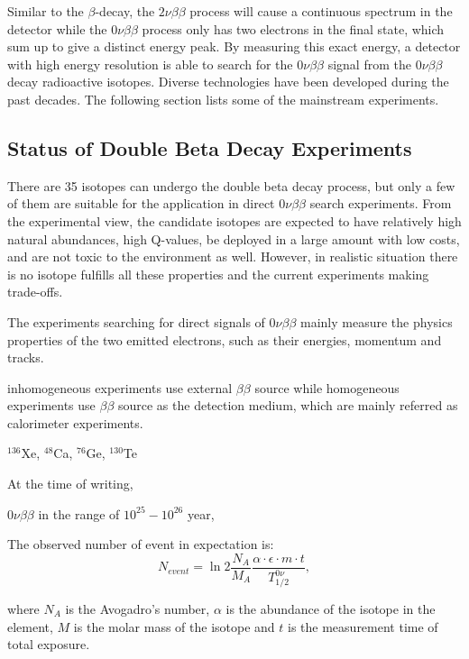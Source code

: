 Similar to the $\beta$-decay, the $2\nu\beta\beta$ process will cause a continuous spectrum in the detector while the $0\nu\beta\beta$ process only has two electrons in the final state, which sum up to give a distinct energy peak. By measuring this exact energy, a detector with high energy resolution is able to search for the $0\nu\beta\beta$ signal from the $0\nu\beta\beta$ decay radioactive isotopes. Diverse technologies have been developed during the past decades. The following section lists some of the mainstream experiments.





\subsection{Status of Double Beta Decay Experiments}

There are 35 isotopes can undergo the double beta decay process, but only a few of them are suitable for the application in direct $0\nu\beta\beta$ search experiments\cite{giunti2007fundamentals}. From the experimental view, the candidate isotopes are expected to have relatively high natural abundances, high Q-values, be deployed in a large amount with low costs, and are not toxic to the environment as well. However, in realistic situation there is no isotope fulfills all these properties and the current experiments making trade-offs\cite{dolinski2019neutrinoless}.

The experiments searching for direct signals of $0\nu\beta\beta$ mainly measure the physics properties of the two emitted electrons, such as their energies, momentum and tracks. 

inhomogeneous experiments use external $\beta\beta$ source
while homogeneous experiments use $\beta\beta$ source as the detection medium, which are mainly referred as calorimeter experiments\cite{cremonesi2014challenges,shimizu2019double}.


$^{136}$Xe, $^{48}$Ca, $^{76}$Ge, $^{130}$Te

At the time of writing, 

$0\nu\beta\beta$ in the range of $10^{25}-10^{26}$ year,



The observed number of event in expectation is: 
\[
N_{event} = \ln 2 \frac{N_A}{M_A}\frac{\alpha\cdot\epsilon\cdot m\cdot t}{T^{0\nu}_{1/2}},
\]

where $N_A$ is the Avogadro's number, $\alpha$ is the abundance of the isotope in the element, 
$M$ is the molar mass of the isotope
and $t$ is the measurement time of total exposure.



